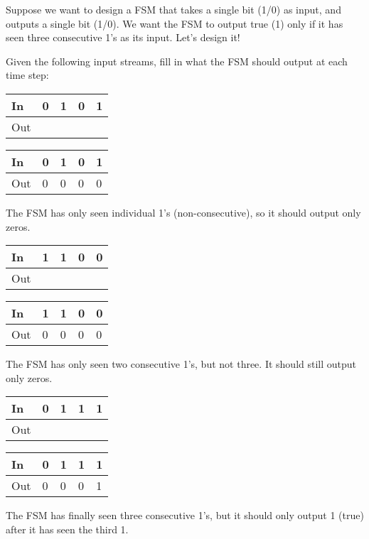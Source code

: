 \begin{blocksection}
Suppose we want to design a FSM that takes a single bit (1/0) as input, and outputs a single bit (1/0). We want the FSM to output true (1) only if it has seen three consecutive 1’s as its input. Let’s design it!

\question
Given the following input streams, fill in what the FSM should output at each time step:
\begin{parts}

\item
\begin{tabular}{ |l|l|l|l|l| } 
 \hline
 In & 0 & 1 & 0 & 1 \\
 \hline
 Out & & & & \\
\end{tabular}

\begin{solution}
\begin{tabular}{ |l|l|l|l|l| } 
 \hline
 In & 0 & 1 & 0 & 1 \\
 \hline
 Out & 0 & 0 & 0 & 0 \\
\end{tabular}
The FSM has only seen individual 1’s (non-consecutive), so it should output only zeros.
\end{solution}
\item

\begin{tabular}{ |l|l|l|l|l| } 
 \hline
 In & 1 & 1 & 0 & 0 \\
 \hline
 Out & & & & \\
\end{tabular}

\begin{solution}
\begin{tabular}{ |l|l|l|l|l| } 
 \hline
 In & 1 & 1 & 0 & 0 \\
 \hline
 Out & 0 & 0 & 0 & 0 \\
\end{tabular}
The FSM has only seen two consecutive 1’s, but not three. It should still output only zeros.
\end{solution}

\item
\begin{tabular}{ |l|l|l|l|l| } 
 \hline
 In & 0 & 1 & 1 & 1 \\
 \hline
 Out & & & & \\
\end{tabular}

\begin{solution}
\begin{tabular}{ |l|l|l|l|l| } 
 \hline
 In & 0 & 1 & 1 & 1 \\
 \hline
 Out & 0 & 0 & 0 & 1 \\
\end{tabular}
The FSM has finally seen three consecutive 1’s, but it should only output 1 (true) after it has seen the third 1.
\end{solution}
\end{parts}

\end{blocksection}
